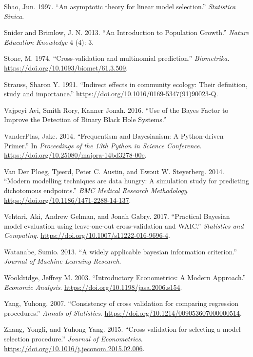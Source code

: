 \documentclass[12pt,]{article}
\begin{document}
\leavevmode\hypertarget{ref-Shao1997}{}%
Shao, Jun. 1997. ``An asymptotic theory for linear model selection.'' \emph{Statistica Sinica}.

\leavevmode\hypertarget{ref-Snider2013}{}%
Snider and Brimlow, J. N. 2013. ``An Introduction to Population Growth.'' \emph{Nature Education Knowledge} 4 (4): 3.

\leavevmode\hypertarget{ref-Stone1974}{}%
Stone, M. 1974. ``Cross-validation and multinomial prediction.'' \emph{Biometrika}. \url{https://doi.org/10.1093/biomet/61.3.509}.

\leavevmode\hypertarget{ref-Strauss1991}{}%
Strauss, Sharon Y. 1991. ``Indirect effects in community ecology: Their definition, study and importance.'' \url{https://doi.org/10.1016/0169-5347(91)90023-Q}.

\leavevmode\hypertarget{ref-VajpeyiAviSmithRory2016}{}%
Vajpeyi Avi, Smith Rory, Kanner Jonah. 2016. ``Use of the Bayes Factor to Improve the Detection of Binary Black Hole Systems.''

\leavevmode\hypertarget{ref-VanderPlas2014}{}%
VanderPlas, Jake. 2014. ``Frequentism and Bayesianism: A Python-driven Primer.'' In \emph{Proceedings of the 13th Python in Science Conference}. \url{https://doi.org/10.25080/majora-14bd3278-00e}.

\leavevmode\hypertarget{ref-VanDerPloeg2014}{}%
Van Der Ploeg, Tjeerd, Peter C. Austin, and Ewout W. Steyerberg. 2014. ``Modern modelling techniques are data hungry: A simulation study for predicting dichotomous endpoints.'' \emph{BMC Medical Research Methodology}. \url{https://doi.org/10.1186/1471-2288-14-137}.

\leavevmode\hypertarget{ref-Vehtari2017}{}%
Vehtari, Aki, Andrew Gelman, and Jonah Gabry. 2017. ``Practical Bayesian model evaluation using leave-one-out cross-validation and WAIC.'' \emph{Statistics and Computing}. \url{https://doi.org/10.1007/s11222-016-9696-4}.

\leavevmode\hypertarget{ref-Watanabe2013}{}%
Watanabe, Sumio. 2013. ``A widely applicable bayesian information criterion.'' \emph{Journal of Machine Learning Research}.

\leavevmode\hypertarget{ref-Wooldridge2003}{}%
Wooldridge, Jeffrey M. 2003. ``Introductory Econometrics: A Modern Approach.'' \emph{Economic Analysis}. \url{https://doi.org/10.1198/jasa.2006.s154}.

\leavevmode\hypertarget{ref-Yang2007}{}%
Yang, Yuhong. 2007. ``Consistency of cross validation for comparing regression procedures.'' \emph{Annals of Statistics}. \url{https://doi.org/10.1214/009053607000000514}.

\leavevmode\hypertarget{ref-Zhang2015}{}%
Zhang, Yongli, and Yuhong Yang. 2015. ``Cross-validation for selecting a model selection procedure.'' \emph{Journal of Econometrics}. \url{https://doi.org/10.1016/j.jeconom.2015.02.006}.
\end{document}
